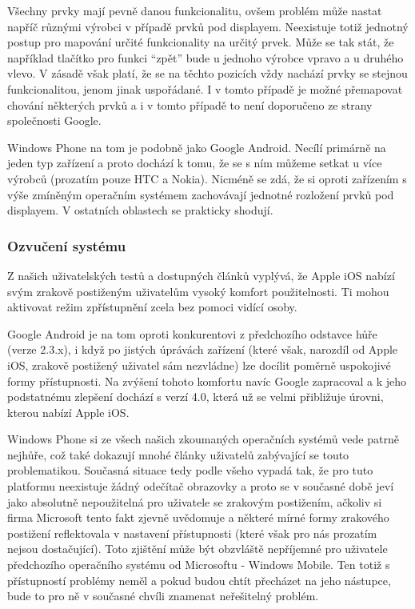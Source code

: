 \documentclass[thesis=M,czech]{FITthesis}[2012/06/26]
\begin{document}
Všechny prvky mají pevně danou funkcionalitu, ovšem problém může nastat napříč různými výrobci v případě prvků pod displayem. Neexistuje totiž jednotný postup pro mapování určité funkcionality na určitý prvek. Může se tak stát, že například tlačítko pro funkci “zpět” bude u jednoho výrobce vpravo a u druhého vlevo. V zásadě však platí, že se na těchto pozicích vždy nachází prvky se stejnou funkcionalitou, jenom jinak uspořádané. I v tomto případě je možné přemapovat chování některých prvků a i v tomto případě to není doporučeno ze strany společnosti Google.

Windows Phone na tom je podobně jako Google Android. Necílí primárně na jeden typ zařízení a proto dochází k tomu, že se s ním můžeme setkat u více výrobců (prozatím pouze HTC a Nokia). Nicméně se zdá, že si oproti zařízením s výše zmíněným operačním systémem zachovávají jednotné rozložení prvků pod displayem. V ostatních oblastech se prakticky shodují.

\subsubsection{Ozvučení systému}
Z našich uživatelských testů a dostupných článků\cite{ipad_blind}\cite{iphone_blind}\cite{iphone_inside} vyplývá, že Apple iOS nabízí svým zrakově postiženým uživatelům vysoký komfort použitelnosti. Ti mohou aktivovat režim zpřístupnění zcela bez pomoci vidící osoby.

Google Android je na tom oproti konkurentovi z předchozího odstavce hůře (verze 2.3.x), i když po jistých úprávách zařízení (které však, narozdíl od Apple iOS, zrakově postižený uživatel sám nezvládne) lze docílit poměrně uspokojivé formy přístupnosti\cite{android_blind}. Na zvýšení tohoto komfortu navíc Google zapracoval a k jeho podstatnému zlepšení dochází s verzí 4.0, která už se velmi přibližuje úrovni, kterou nabízí Apple iOS\cite{android_start}.

Windows Phone si ze všech našich zkoumaných operačních systémů vede patrně nejhůře, což také dokazují mnohé články\cite{touch_yes_or_no}\cite{win8_blind}\cite{win8_blind2} uživatelů zabývající se touto problematikou. Současná situace tedy podle všeho vypadá tak, že pro tuto platformu neexistuje žádný odečítač obrazovky a proto se v současné době jeví jako absolutně nepoužitelná pro uživatele se zrakovým postižením, ačkoliv si firma Microsoft tento fakt zjevně uvědomuje a některé mírné formy zrakového postižení reflektovala v nastavení přístupnosti\cite{win8_no_reader} (které však pro nás prozatím nejsou dostačující). Toto zjištění může být obzvláště nepříjemné pro uživatele předchozího operačního systému od Microsoftu - Windows Mobile. Ten totiž s přístupností problémy neměl a pokud budou chtít přecházet na jeho nástupce, bude to pro ně v současné chvíli znamenat neřešitelný problém.
\end{document}
